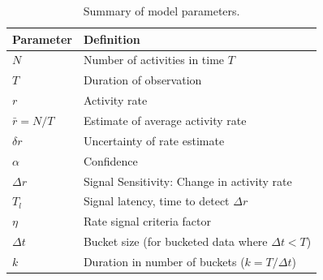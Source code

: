 \documentclass{article}
\begin{document}
\begin{table}
    \begin{tabular}{m{4cm}| m{7cm}}
     \hline
Parameter  & Definition \\
\hline	
$N$ & Number of activities in time $T$\\
$T$ & Duration of observation\\
$r$ & Activity rate \\
$\bar{r} = N/T$ & Estimate of average activity rate \\
$\delta r$ & Uncertainty of rate estimate \\
$\alpha$ & Confidence\\
$\Delta r$ & Signal Sensitivity: Change in activity rate \\
$T_l$ & Signal latency, time to detect $\Delta r$  \\
$\eta$ & Rate signal criteria factor \\
$\Delta t$ & Bucket size (for bucketed data where $\Delta t <T$) \\
$k$ & Duration in number of  buckets ($k=T/\Delta t$) \\
\hline
\end{tabular}
\caption{Summary of model parameters.}
\label{tab:summary}
\end{table}
\end{document}
